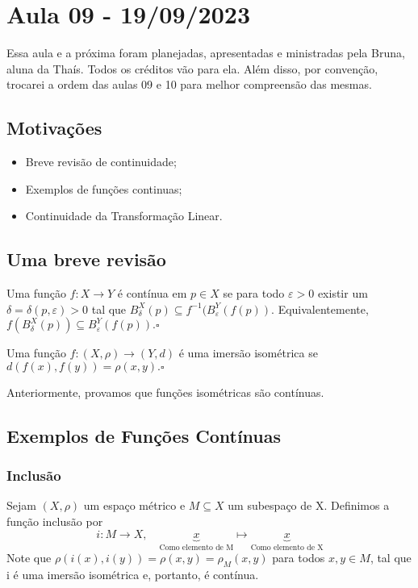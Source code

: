 \documentclass[metric_notes.tex]{subfiles}
\begin{document}
\section{Aula 09 - 19/09/2023}
Essa aula e a próxima foram planejadas, apresentadas e ministradas pela Bruna, aluna da Thaís. Todos os créditos vão para ela.
Além disso, por convenção, trocarei a ordem das aulas 09 e 10 para melhor compreensão das mesmas.
\subsection{Motivações}
\begin{itemize}
	\item Breve revisão de continuidade;
	\item Exemplos de funções continuas;
	\item Continuidade da Transformação Linear.
\end{itemize}
\subsection{Uma breve revisão}
\begin{def*}
	Uma função \(f:X\rightarrow Y\) é contínua em \(p\in X\) se para todo \(\varepsilon >0\) existir um
	\(\delta =\delta (p, \varepsilon)>0\) tal que \(B_{\delta }^{X}(p)\subseteq{f^{-1}(B_{\varepsilon }^{Y}(f(p))}.\)
	Equivalentemente, \(f(B_{\delta }^{X}(p))\subseteq{B_{\varepsilon }^{Y}(f(p))}.\square\)
\end{def*}
\begin{def*}
	Uma função \(f:(X, \rho )\rightarrow (Y, d)\) é uma imersão isométrica se \(d(f(x), f(y)) = \rho (x, y).\square\)
\end{def*}
Anteriormente, provamos que funções isométricas são contínuas.
\subsection{Exemplos de Funções Contínuas}
\subsubsection{Inclusão}
Sejam \((X, \rho )\) um espaço métrico e \(M\subseteq{X}\) um subespaço de X. Definimos a função inclusão por
\[
	i:M\rightarrow X,\quad \underbrace{x}_{\text{Como elemento de M}}\longmapsto \underbrace{x}_{\text{Como elemento de X}}
\]
Note que \(\rho (i(x), i(y)) = \rho (x, y) = \rho_{M}(x, y)\) para todos \(x, y\in M\), tal que i é uma imersão isométrica
e, portanto, é contínua.
\end{document}
